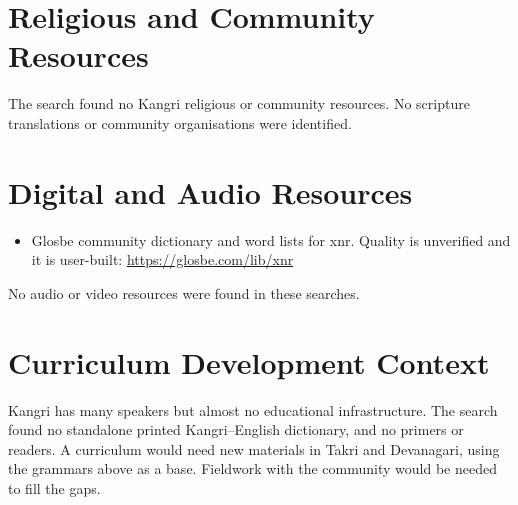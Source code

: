 \documentclass[12pt]{article}
\begin{document}
\section{Religious and Community Resources}
The search found no Kangri religious or community resources. No scripture translations or community organisations were identified.

\section{Digital and Audio Resources}
\begin{itemize}
\item Glosbe community dictionary and word lists for xnr. Quality is unverified and it is user-built: \url{https://glosbe.com/lib/xnr}
\end{itemize}
No audio or video resources were found in these searches.

\section{Curriculum Development Context}
Kangri has many speakers but almost no educational infrastructure. The search found no standalone printed Kangri--English dictionary, and no primers or readers. A curriculum would need new materials in Takri and Devanagari, using the grammars above as a base. Fieldwork with the community would be needed to fill the gaps.
\end{document}
